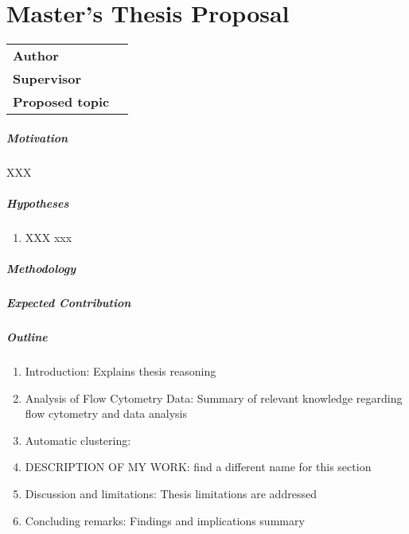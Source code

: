 \chapter*{Master's Thesis Proposal}

\begin{tabular}{lp{10.1cm}}
		\hline
		\textbf{Author} &\href{mailto:\Email}{\AutorDP}\\
		\textbf{Supervisor} &\href{mailto:\EmailSup}{\Supervisor}\\
		\textbf{Proposed topic} &\Bookname\\
		\hline
\end{tabular}

\bigskip

\small
\paragraph{Motivation}
XXX



\paragraph{Hypotheses}
\begin{enumerate}
		\item[] XXX xxx
\end{enumerate}

\paragraph{Methodology}


\paragraph{Expected Contribution}


\paragraph{Outline}
\begin{enumerate}
	\item Introduction: Explains thesis reasoning
	\item Analysis of Flow Cytometry Data: Summary of relevant knowledge regarding flow cytometry and data analysis
	\item Automatic clustering: 
	\item DESCRIPTION OF MY WORK: find a different name for this section 
	\item Discussion and limitations: Thesis limitations are addressed
	\item Concluding remarks: Findings and implications summary
\end{enumerate}


